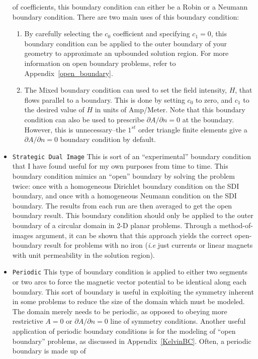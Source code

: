 \documentclass[12pt]{report}
\begin{document}
\begin{itemize}
of coefficients, this boundary condition can either be a Robin or a
Neumann boundary condition. There are two main uses of this
boundary condition:
\begin{enumerate}
\item By carefully selecting the $c_0$ coefficient and specifying
$c_1 = 0$, this boundary condition can be applied to the outer
boundary of your geometry to approximate an upbounded solution
region.  For more information on open boundary problems, refer to
Appendix~\ref{open_boundary}.
\item The Mixed boundary condition can used to
set the field intensity, $H$, that flows parallel to a boundary.
This is done by setting $c_0$ to zero, and $c_1$ to the desired
value of $H$ in units of Amp/Meter. Note that this boundary
condition can also be used to prescribe $\partial A/\partial n=0$
at the boundary. However, this is unnecessary--the $1^{st}$ order
triangle finite elements give a $\partial A/\partial n=0$ boundary
condition by default.
\end{enumerate}
\item {\tt Strategic Dual Image}
This is sort of an ``experimental'' boundary condition that I have
found useful for my own purposes from time to time.  This boundary
condition mimics an ``open'' boundary by solving the problem
twice: once with a homogeneous Dirichlet boundary condition on the
SDI boundary, and once with a homogeneous Neumann condition on the
SDI boundary.  The results from each run are then averaged to get
the open boundary result.  This boundary condition should only be
applied to the outer boundary of a circular domain in 2-D planar
problems.  Through a method-of-images argument, it can be shown
that this approach yields the correct open-boundary result for
problems with no iron ({\em i.e} just currents or linear magnets
with unit permeability in the solution region).
\item{\tt Periodic}
This type of boundary condition is applied to either two segments
or two arcs to force the magnetic vector potential to be identical
along each boundary.  This sort of boundary is useful in exploiting
the symmetry inherent in some problems to reduce the size of the
domain which must be modeled.    The domain merely needs to be
periodic, as opposed to obeying more restrictive $A=0$ or $\partial
A / \partial n = 0$ line of symmetry conditions. Another useful
application of periodic boundary conditions is for the modeling of
``open boundary'' problems, as discussed in
Appendix~\ref{KelvinBC}. Often, a periodic boundary is made up of

\end{itemize}
\end{document}
